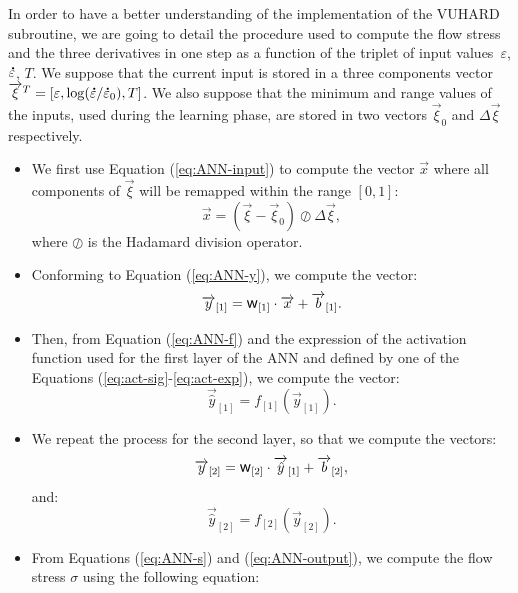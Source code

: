 \documentclass[algorithms,article,submit,pdftex,oneauthors]{Definitions/mdpi}
\DeclareRobustCommand{\w}{\mbox{\large\ensuremath{\mathsf{w}}}}
\DeclareRobustCommand{\lay}[1]{_{[#1]}}
\DeclareRobustCommand{\mdot}[1]{\accentset{\mbox{\bfseries .}}{#1}}
\begin{document}
In order to have a better understanding of the implementation of the VUHARD subroutine, we are going to detail the procedure used to compute the flow stress and the three derivatives in one step as a function of the triplet of input values~$\varepsilon$, $\mdot{\varepsilon}$, $T$.
We suppose that the current input is stored in a three components vector $\overrightarrow{\xi}^T=\left[\varepsilon, \log(\mdot{\varepsilon}/\mdot{\varepsilon}_0), T\right]$.
We also suppose that the minimum and range values of the inputs, used during the learning phase, are stored in two vectors $\overrightarrow{\xi}_{0}$ and $\Delta\overrightarrow{\xi}$ respectively.
\begin{itemize}
\item We first use Equation (\ref{eq:ANN-input}) to compute the vector $\overrightarrow{x}$ where all components of $\overrightarrow{\xi}$ will be remapped within the range $[0,1]$:
\begin{equation}
\overrightarrow{x}=\left(\overrightarrow{\xi}-\overrightarrow{\xi}_{0}\right)\oslash\Delta\overrightarrow{\xi},
\end{equation}
where $\oslash$ is the Hadamard division operator.
\item Conforming to Equation (\ref{eq:ANN-y}), we compute the vector:
\begin{equation}
\overrightarrow{y}\lay{1}=\w\lay{1}\cdot\overrightarrow{x}+\overrightarrow{b}\lay{1}.
\end{equation}
\item Then, from Equation (\ref{eq:ANN-f}) and the expression of the activation function used for the first layer of the ANN and defined by one of the Equations (\ref{eq:act-sig}-\ref{eq:act-exp}), we compute the vector:
\begin{equation}
\overrightarrow{\hat{y}}\lay{1}=f\lay{1}(\overrightarrow{y}\lay{1}).
\end{equation}
\item We repeat the process for the second layer, so that we compute the vectors: \begin{equation}
\overrightarrow{y}\lay{2}=\w\lay{2}\cdot\overrightarrow{\hat{y}}\lay{1}+\overrightarrow{b}\lay{2},
\end{equation}
and:
\begin{equation}
\overrightarrow{\hat{y}}\lay{2}=f\lay{2}(\overrightarrow{y}\lay{2}).
\end{equation}
\item From Equations (\ref{eq:ANN-s}) and (\ref{eq:ANN-output}), we compute the flow stress $\sigma$ using the following equation:

\end{itemize}
\end{document}
